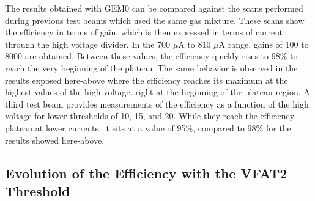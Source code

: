       The results obtained with GEM0 can be compared against the scans performed during previous test beams \cite{Abbaneo:1709907, Abbaneo:1401079} which used the same gas mixture. These scans show the efficiency in terms of gain, which is then expressed in terms of current through the high voltage divider. In the 700 $\mu$A to 810 $\mu$A range, gains of 100 to 8000 are obtained. Between these values, the efficiency quickly rises to 98\% to reach the very beginning of the plateau. The same behavior is observed in the results exposed here-above where the efficiency reaches its maximum at the highest values of the high voltage, right at the beginning of the plateau region. A third test beam \cite{Abbaneo:1494965} provides measurements of the efficiency as a function of the high voltage for lower thresholds of 10, 15, and 20. While they reach the efficiency plateau at lower currents, it sits at a value of 95\%, compared to 98\% for the results showed here-above.

    \subsection{Evolution of the Efficiency with the VFAT2 Threshold}

